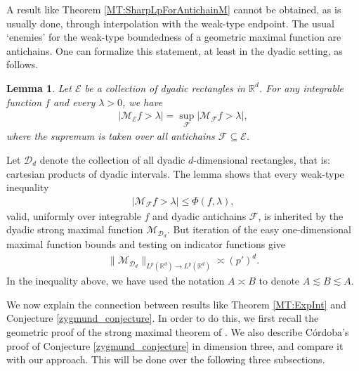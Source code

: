 \documentclass[oneside]{amsart}
\newtheorem*{lemma*}{Lemma}
\theoremstyle{definition}
\theoremstyle{plain}
\numberwithin{equation}{section}
\numberwithin{theorem}{section}
\newcommand{\sh}{\operatorname{sh}}
\begin{document}
A result like Theorem \ref{MT:SharpLpForAntichainM} cannot be obtained, as is
usually done, through interpolation with the weak-type endpoint.
The usual `enemies' for the weak-type boundedness of a geometric maximal
function are antichains.
One can formalize this statement, at least in the dyadic setting, as follows.
\begin{lemma*}
  Let $\mathcal{E}$ be a collection of dyadic rectangles in $\mathbb{R}^d$.
  For any integrable function $f$ and every $\lambda > 0$, we have
  \begin{align*}
    |\mathcal{M}_{\mathcal{E}} f > \lambda| =
    \sup_{\mathcal{F}} |\mathcal{M}_{\mathcal{F}} f > \lambda|,
  \end{align*}
  where the supremum is taken over all antichains $\mathcal{F} \subseteq
  \mathcal{E}$.
\end{lemma*}

Let $\mathcal{D}_d$ denote the collection of all dyadic $d$-dimensional
rectangles, that is: cartesian products of dyadic intervals.
The lemma shows that every weak-type inequality
\begin{align*}
  |\mathcal{M}_{\mathcal{F}} f > \lambda| \leq \Phi(f, \lambda),
\end{align*}
valid, uniformly over integrable $f$ and dyadic antichains $\mathcal{F}$,
is inherited by the dyadic strong maximal function
$\mathcal{M}_{\mathcal{D}_d}$.
But iteration of the easy one-dimensional maximal function bounds and testing on
indicator functions give
\begin{align*}
  \|\mathcal{M}_{\mathcal{D}_d}\|_{L^p(\mathbb{R}^d) \to L^p(\mathbb{R}^d)}
  \asymp (p')^d.
\end{align*}
In the inequality above, we have used the notation $A \asymp B$ to denote
$A \lesssim B \lesssim A$.

We now explain the connection between results like Theorem \ref{MT:ExpInt} and
Conjecture \ref{zygmund_conjecture}.
In order to do this, we first recall the geometric proof of the strong maximal
theorem of \cite{CordobaFefferman1975}.
We also describe Córdoba's proof \cite{Cordoba1979} of Conjecture
\ref{zygmund_conjecture} in dimension three, and compare it with our approach.
This will be done over the following three subsections.
\end{document}
